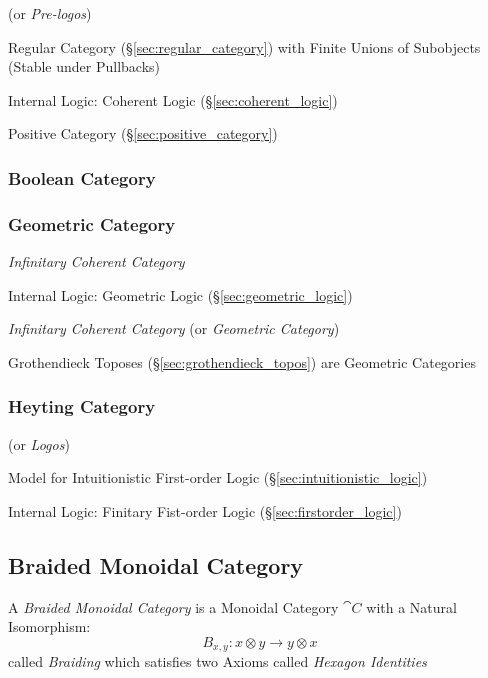 (or \emph{Pre-logos})

Regular Category (\S\ref{sec:regular_category}) with Finite Unions of
Subobjects (Stable under Pullbacks)

Internal Logic: Coherent Logic (\S\ref{sec:coherent_logic})

Positive Category (\S\ref{sec:positive_category})



\subsubsection{Boolean Category}\label{sec:boolean_category}

\subsubsection{Geometric Category}\label{sec:geometric_category}

\emph{Infinitary Coherent Category}

Internal Logic: Geometric Logic (\S\ref{sec:geometric_logic})

\emph{Infinitary Coherent Category} (or \emph{Geometric Category})

Grothendieck Toposes (\S\ref{sec:grothendieck_topos}) are Geometric
Categories



\subsubsection{Heyting Category}\label{sec:heyting_category}

(or \emph{Logos})

Model for Intuitionistic First-order Logic
(\S\ref{sec:intuitionistic_logic})

Internal Logic: Finitary Fist-order Logic
(\S\ref{sec:firstorder_logic})



\subsection{Braided Monoidal Category}\label{sec:braided_monoidal}

A \emph{Braided Monoidal Category} is a Monoidal Category $\cat{C}$
with a Natural Isomorphism:
\[
  B_{x,y} : x \otimes y \rightarrow y \otimes x
\]
called \emph{Braiding} which satisfies two Axioms called \emph{Hexagon
  Identities} %


